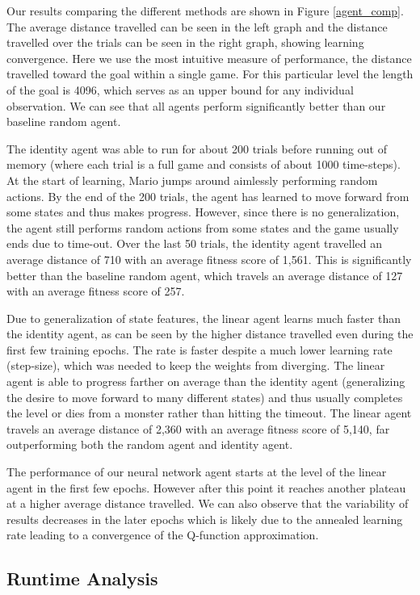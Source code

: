 \documentclass[12pt]{article}
\begin{document}
Our results comparing the different methods are shown in Figure \ref{agent_comp}. The average distance travelled can be seen in the left graph and the distance travelled over the trials can be seen in the right graph, showing learning convergence. Here we use the most intuitive measure of performance, the distance travelled toward the goal within a single game. For this particular level the length of the goal is 4096, which serves as an upper bound for any individual observation. We can see that all agents perform significantly better than our baseline random agent. 

The identity agent was able to run for about 200 trials before running out of memory (where each trial is a full game and consists of about 1000 time-steps). At the start of learning, Mario jumps around aimlessly performing random actions. By the end of the 200 trials, the agent has learned to move forward from some states and thus makes progress. However, since there is no generalization, the agent still performs random actions from some states and the game usually ends due to time-out. Over the last 50 trials, the identity agent travelled an average distance of 710 with an average fitness score of 1,561. This is significantly better than the baseline random agent, which travels an average distance of 127 with an average fitness score of 257.

Due to generalization of state features, the linear agent learns much faster than the identity agent, as can be seen by the higher distance travelled even during the first few training epochs. The rate is faster despite a much lower learning rate (step-size), which was needed to keep the weights from diverging. The linear agent is able to progress farther on average than the identity agent (generalizing the desire to move forward to many different states) and thus usually completes the level or dies from a monster rather than hitting the timeout. The linear agent travels an average distance of 2,360 with an average fitness score of 5,140, far outperforming both the random agent and identity agent.

The performance of our neural network agent starts at the level of the linear agent in the first few epochs. However after this point it reaches another plateau at a higher average distance travelled. We can also observe that the variability of results decreases in the later epochs which is likely due to the annealed learning rate leading to a convergence of the Q-function approximation.

\subsection{Runtime Analysis}
\end{document}
